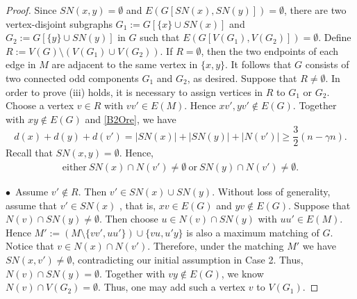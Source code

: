 \documentclass[10pt,a4paper]{amsart}
\begin{document}
\begin{proof}
Since $SN(x,y)=\emptyset$ and $E(G[SN(x),SN(y)])=\emptyset$, there are two vertex-disjoint subgraphs $G_1:=G[\{x\}\cup SN(x)]$ and $G_2:=G[\{y\}\cup SN(y)]$ in $G$ such that $E(G[V(G_1),V(G_2)])=\emptyset$. Define $R:=V(G)\setminus (V(G_1)\cup V(G_2))$. If $R=\emptyset$, then the two endpoints of each edge in $M$ are adjacent to the same vertex in $\{x, y\}$. It follows that $G$ consists of two connected odd components $G_1$ and $G_2$, as desired. Suppose that $R\neq \emptyset$. In order to prove (iii) holds, it is necessary to assign vertices in $R$ to $G_1$ or $G_2$. Choose a vertex $v \in R$ with $vv'\in E(M)$. Hence $xv',yv'\notin E(G)$. Together with $xy\notin E(G)$ and \eqref{B2Ore}, we have 
$$
d(x)+d(y)+d(v')=|SN(x)|+|SN(y)|+|N(v')|\geq \frac{3}{2}(n-\gamma n).
$$
Recall that $SN(x,y)=\emptyset$. Hence, 
\begin{align}\label{eitheror}
    \text{either}\ SN(x)\cap N(v')\ne \emptyset\ \text{or}\ SN(y)\cap N(v')\ne \emptyset.
\end{align}



$\bullet$\ Assume  $v'\notin R$. Then $v'\in SN(x)\cup SN(y)$. Without loss of generality, assume that $v'\in SN(x)$%
, that is, $xv\in E(G)$ and $yv\notin E(G)$. Suppose that $N(v)\cap SN(y)\ne \emptyset$. Then choose $u\in N(v)\cap SN(y)$ with $uu'\in E(M)$. Hence $M':=(M\setminus \{vv',uu'\})  \cup \{vu,u'y\}$  is also a maximum matching of $G$. Notice that $v\in N(x)\cap N(v')$. Therefore, under the matching $M'$ we have $SN(x,v')\neq \emptyset$, contradicting our initial assumption in Case 2. Thus, $N(v)\cap SN(y)= \emptyset$. Together with $vy\notin E(G)$, we know $N(v)\cap V(G_2)=\emptyset$. Thus, one may add such a vertex $v$ to $V(G_1)$. %


\end{proof}
\end{document}

